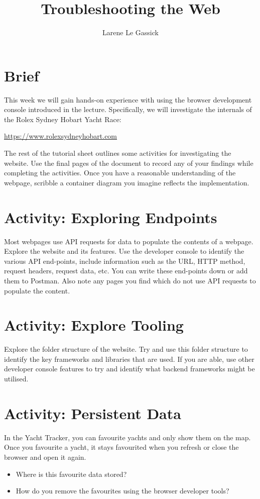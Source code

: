 \documentclass{csse4400}
\title{Troubleshooting the Web}
\author{Larene Le Gassick}
\date{\week{5}}
\begin{document}
\maketitle

\section{Brief}

This week we will gain hands-on experience with using the browser development console introduced in the lecture.
Specifically, we will investigate the internals of the Rolex Sydney Hobart Yacht Race:

\noindent\url{https://www.rolexsydneyhobart.com}

The rest of the tutorial sheet outlines some activities for investigating the website.
Use the final pages of the document to record any of your findings while completing the activities.
Once you have a reasonable understanding of the webpage,
scribble a container diagram you imagine reflects the implementation.

\section{Activity: Exploring Endpoints}
Most webpages use API requests for data to populate the contents of a webpage.
Explore the website and its features.
Use the developer console to identify the various API end-points,
include information such as the URL, HTTP method, request headers, request data, etc.
You can write these end-points down or add them to Postman.
Also note any pages you find which do not use API requests to populate the content.

\section{Activity: Explore Tooling}
Explore the folder structure of the website.
Try and use this folder structure to identify the key frameworks and libraries that are used.
If you are able,
use other developer console features to try and identify what backend frameworks might be utilised.

\section{Activity: Persistent Data}
In the Yacht Tracker,
you can favourite yachts and only show them on the map.
Once you favourite a yacht,
it stays favourited when you refresh or close the browser and open it again.\vspace{-0.6em}
\begin{itemize}
    \setlength\itemsep{-0.5em}
    \item Where is this favourite data stored?
    \item How do you remove the favourites using the browser developer tools?
\end{itemize}
\end{document}
